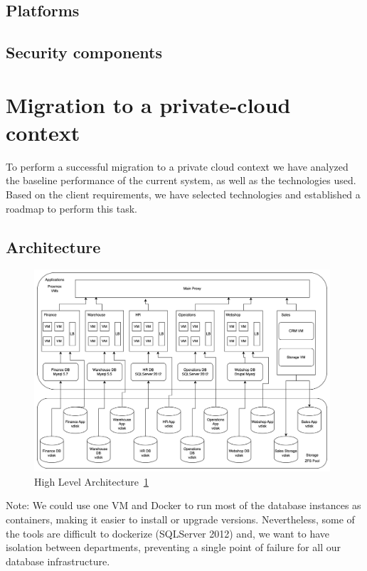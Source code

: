 \documentclass{llncs}
\begin{document}
\subsection{Platforms}

\subsection{Security components}


\section{Migration to a private-cloud context}

To perform a successful migration to a private cloud context we have analyzed the baseline performance of the current system, as well as the technologies used. Based on the client requirements, we have selected technologies and established a roadmap to perform this task.   

\subsection{Architecture}

\begin{figure}[htbp]
  \begin{center}
    \includegraphics[width=11cm]{diagrams/architecture.drawio.png}
    \caption{High Level Architecture~\ref{High_Level_Architecture}}
    \label{High_Level_Architecture} %
  \end{center}
\end{figure}

Note: We could use one VM and Docker to run most of the database instances as containers, making it easier to install or upgrade versions. Nevertheless, some of the tools are difficult to dockerize (SQLServer 2012) and, we want to have isolation between departments, preventing a single point of failure for all our database infrastructure.
\end{document}
